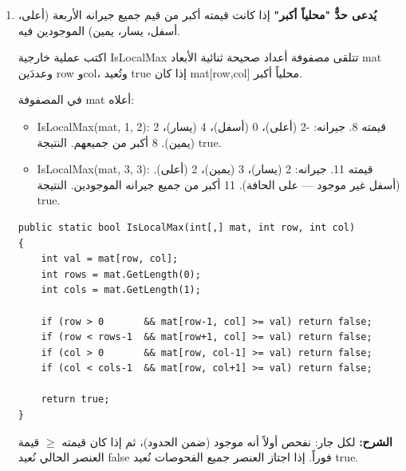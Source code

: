 \documentclass[14pt]{extarticle}
\begin{document}
\begin{enumerate}[itemsep=2em]

\item
\textbf{يُدعى حدٌّ "محلياً أكبر"} إذا كانت قيمته أكبر من قيم جميع جيرانه الأربعة (أعلى، أسفل، يسار، يمين) الموجودين فيه.

اكتب عملية خارجية \textenglish{IsLocalMax} تتلقى مصفوفة أعداد صحيحة ثنائية الأبعاد \textenglish{mat} وعددَين \textenglish{row} و\textenglish{col}، وتُعيد \textenglish{true} إذا كان \textenglish{mat[row,col]} محلياً أكبر.

\begin{boxExample}
في المصفوفة \textenglish{mat} أعلاه:
\begin{itemize}[itemsep=1pt]
    \item \textenglish{IsLocalMax(mat, 1, 2)}: قيمته 8. جيرانه: \textenglish{-2} (أعلى)، \textenglish{0} (أسفل)، \textenglish{4} (يسار)، \textenglish{2} (يمين). 8 أكبر من جميعهم. النتيجة \textenglish{true}.
    \item \textenglish{IsLocalMax(mat, 3, 3)}: قيمته 11. جيرانه: \textenglish{2} (يسار)، \textenglish{3} (يمين)، \textenglish{2} (أعلى). (أسفل غير موجود — على الحافة). 11 أكبر من جميع جيرانه الموجودين. النتيجة \textenglish{true}.
\end{itemize}
\end{boxExample}

\ifwithsols
\begin{boxSolution}
\begin{boxCode}
\begin{english}
\begin{verbatim}
public static bool IsLocalMax(int[,] mat, int row, int col)
{
    int val = mat[row, col];
    int rows = mat.GetLength(0);
    int cols = mat.GetLength(1);

    if (row > 0       && mat[row-1, col] >= val) return false;
    if (row < rows-1  && mat[row+1, col] >= val) return false;
    if (col > 0       && mat[row, col-1] >= val) return false;
    if (col < cols-1  && mat[row, col+1] >= val) return false;

    return true;
}
\end{verbatim}
\end{english}
\end{boxCode}
\textbf{الشرح:} لكل جار: نفحص أولاً أنه موجود (ضمن الحدود)، ثم إذا كان قيمته $\geq$ قيمة العنصر الحالي نُعيد \textenglish{false} فوراً. إذا اجتاز العنصر جميع الفحوصات نُعيد \textenglish{true}.
\end{boxSolution}
\clearpage
\fi


\end{enumerate}
\end{document}
